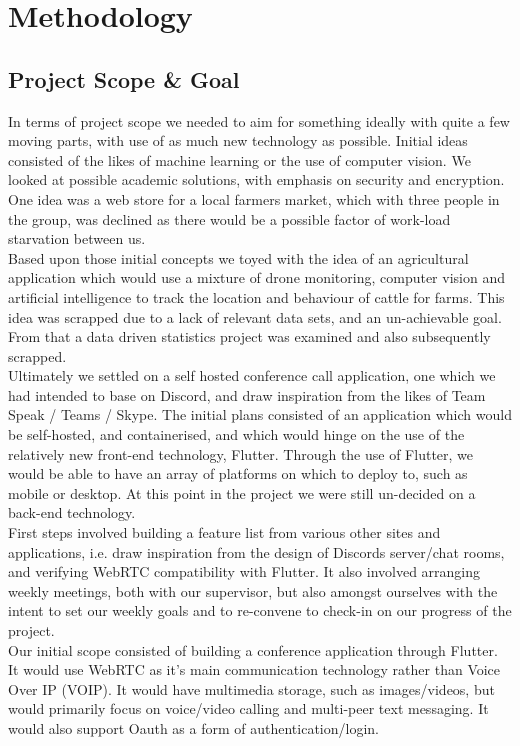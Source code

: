 \chapter{Methodology}
\section{Project Scope \& Goal}
In terms of project scope we needed to aim for something ideally with quite a few moving parts, with use of as much new technology as possible. Initial ideas consisted of the likes of machine learning or the use of computer vision. We looked at possible academic solutions, with emphasis on security and encryption. One idea was a web store for a local farmers market, which with three people in the group, was declined as there would be a possible factor of work-load starvation between us. 
\\ Based upon those initial concepts we toyed with the idea of an agricultural application which would use a mixture of drone monitoring, computer vision and artificial intelligence to track the location and behaviour of cattle for farms. This idea was scrapped due to a lack of relevant data sets, and an un-achievable goal.  From that a data driven statistics project was examined and also subsequently scrapped. 
\\ Ultimately we settled on a self hosted conference call application, one which we had intended to base on Discord, and draw inspiration from the likes of Team Speak / Teams / Skype. The initial plans consisted of an application which would be self-hosted, and containerised, and which would hinge on the use of the relatively new front-end technology, Flutter. Through the use of Flutter, we would be able to have an array of platforms on which to deploy to, such as mobile or desktop. At this point in the project we were still un-decided on a back-end technology.
\\ First steps involved building a feature list from various other sites and applications, i.e. draw inspiration from the design of Discords server/chat rooms, and verifying WebRTC compatibility with Flutter. It also involved arranging weekly meetings, both with our supervisor, but also amongst ourselves with the intent to set our weekly goals and to re-convene to check-in on our progress of the project. 
\\ Our initial scope consisted of building a conference application through Flutter. It would use WebRTC as it’s main communication technology rather than Voice Over IP (VOIP). It would have multimedia storage, such as images/videos, but would primarily focus on voice/video calling and multi-peer text messaging. It would also support Oauth as a form of authentication/login. 

